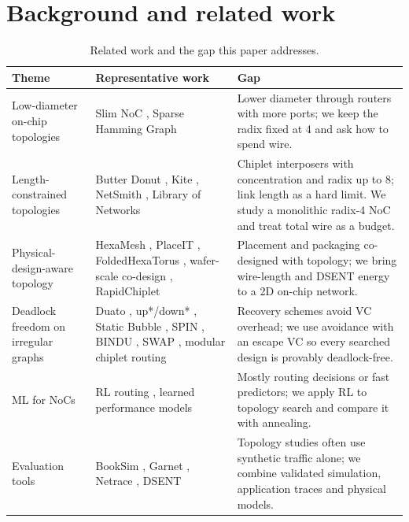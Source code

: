 \documentclass[preprint,12pt,a4paper]{elsarticle}
\begin{document}
\section{Background and related work}
\label{sec:related}

\begin{table}[t]
\centering
\caption{Related work and the gap this paper addresses.}
\label{tab:related}
\small
\begin{tabular}{@{}p{3.1cm}p{4.2cm}p{5.6cm}@{}}
\toprule
Theme & Representative work & Gap \\
\midrule
Low-diameter on-chip topologies & Slim NoC \cite{slimnoc}, Sparse Hamming Graph \cite{shg} & Lower diameter through routers with more ports; we keep the radix fixed at 4 and ask how to spend wire. \\
Length-constrained topologies & Butter Donut \cite{butterdonut}, Kite \cite{kite}, NetSmith \cite{netsmith}, Library of Networks \cite{libnet} & Chiplet interposers with concentration and radix up to 8; link length as a hard limit. We study a monolithic radix-4 NoC and treat total wire as a budget. \\
Physical-design-aware topology & HexaMesh \cite{hexamesh}, PlaceIT \cite{placeit}, FoldedHexaTorus \cite{foldedhexatorus}, wafer-scale co-design \cite{wafer,waferwow}, RapidChiplet \cite{rapidchiplet} & Placement and packaging co-designed with topology; we bring wire-length and DSENT energy to a 2D on-chip network. \\
Deadlock freedom on irregular graphs & Duato \cite{duato1993theory}, up*/down* \cite{schroeder1991autonet}, Static Bubble \cite{staticbubble}, SPIN \cite{spin}, BINDU \cite{bindu}, SWAP \cite{swap}, modular chiplet routing \cite{remote,upp,absorb} & Recovery schemes avoid VC overhead; we use avoidance with an escape VC so every searched design is provably deadlock-free. \\
ML for NoCs & RL routing \cite{deepnr,khanpasricha,drlar}, learned performance models \cite{noception,mlassess,mllatency,noctopus} & Mostly routing decisions or fast predictors; we apply RL to topology search and compare it with annealing. \\
Evaluation tools & BookSim \cite{booksim}, Garnet \cite{garnet}, Netrace \cite{netrace}, DSENT \cite{dsent} & Topology studies often use synthetic traffic alone; we combine validated simulation, application traces and physical models. \\
\bottomrule
\end{tabular}
\end{table}
\end{document}
